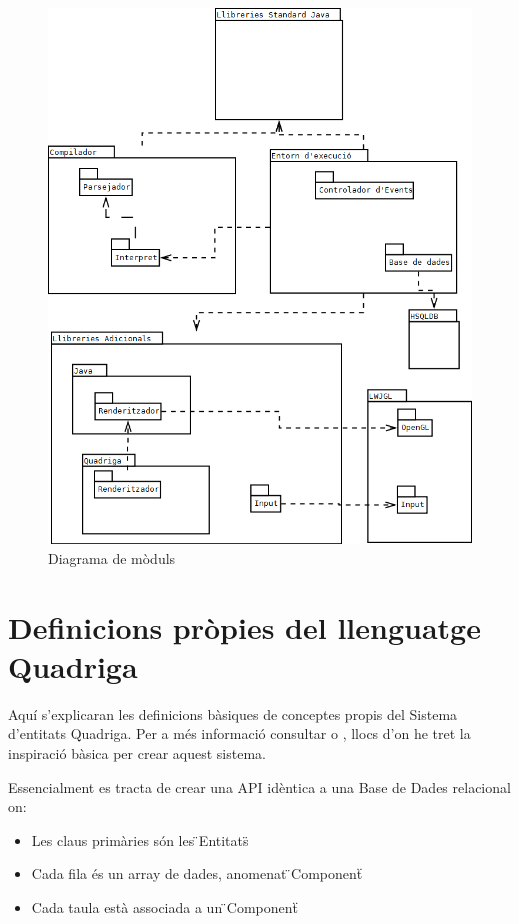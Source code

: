   \begin{figure}
    \includegraphics[width=1\linewidth]{./img/Moduls.png}
    \caption{Diagrama de mòduls \label{fig:DiagramaDeModuls}}
  \end{figure}
  
\section{Definicions pròpies del llenguatge Quadriga}

  Aquí s'explicaran les definicions bàsiques de conceptes propis del Sistema d'entitats Quadriga. Per a més informació consultar \cite{EntityWikiB} o \cite{Martin07}, llocs d'on he tret la inspiració bàsica per crear aquest sistema.

  Essencialment es tracta de crear una API idèntica a una Base de Dades relacional on:

  \begin{itemize}
    \item Les claus primàries són les \"{}Entitats\"{}
    \item Cada fila és un array de dades, anomenat \"{}Component\"{}
    \item Cada taula està associada a un \"{}Component\"{}
  \end{itemize}

